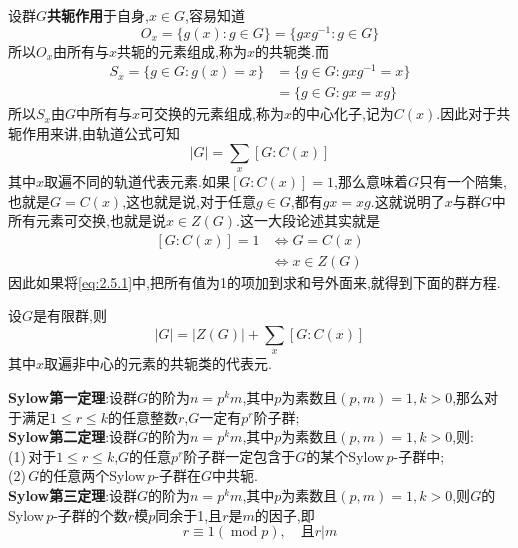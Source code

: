 设群$G$\textbf{共轭作用}于自身,$x\in G$,容易知道
$$
O_x=\{g(x):g\in G\}=\{gxg^{-1}:g\in G\}
$$
所以$O_x$由所有与$x$共轭的元素组成,称为$x$的共轭类.而
$$
\begin{aligned}
    S_x=\{g\in G:g(x)=x\} &= \{g\in G:gxg^{-1}=x\}\\
                          &= \{g\in G:gx=xg\}
\end{aligned}
$$
所以$S_x$由$G$中所有与$x$可交换的元素组成,称为$x$的中心化子,记为$C(x)$.因此对于共轭作用来讲,由轨道公式可知
\begin{equation}
    |G|=\sum_x[G:C(x)]
    \label{eq:2.5.1}
\end{equation}
其中$x$取遍不同的轨道代表元素.如果$[G:C(x)]=1$,那么意味着$G$只有一个陪集,也就是$G=C(x)$,这也就是说,对于任意$g\in G$,都有$gx=xg$.这就说明了$x$与群$G$中所有元素可交换,也就是说$x\in Z(G)$.这一大段论述其实就是
$$
\begin{aligned}
    [G:C(x)]=1 &\Longleftrightarrow G=C(x)\\
               &\Longleftrightarrow x\in Z(G)
\end{aligned}
$$
因此如果将\eqref{eq:2.5.1}中,把所有值为1的项加到求和号外面来,就得到下面的群方程.\
\begin{tcolorbox}[colback=KuangNei,colframe=BianKuang,title=\textbf{群方程},sharpish corners]
    设$G$是有限群,则
    $$
    |G|=|Z(G)|+\sum_{x}[G:C(x)]
    $$
    其中$x$取遍非中心的元素的共轭类的代表元.
\end{tcolorbox}

\begin{tcolorbox}[colback=KuangNei,colframe=BianKuang,title=\textbf{Sylow定理},sharpish corners]
    \textbf{Sylow第一定理}:设群$G$的阶为$n=p^km$,其中$p$为素数且$(p,m)=1,k>0$,那么对于满足$1\leqslant r\leqslant k$的任意整数$r$,$G$一定有$p^r$阶子群;\\
    \textbf{Sylow第二定理}:设群$G$的阶为$n=p^km$,其中$p$为素数且$(p,m)=1,k>0$,则:\\
    \qquad (1)\,对于$1\leqslant r\leqslant k$,$G$的任意$p^r$阶子群一定包含于$G$的某个Sylow\,$p$-子群中;\\
    \qquad (2)\,$G$的任意两个Sylow\,$p$-子群在$G$中共轭.\\
    \textbf{Sylow第三定理}:设群$G$的阶为$n=p^km$,其中$p$为素数且$(p,m)=1,k>0$,则$G$的Sylow\,$p$-子群的个数$r$模$p$同余于1,且$r$是$m$的因子,即
    $$
    r\equiv 1(\operatorname{mod} p),\quad \text{且}r|m
    $$
\end{tcolorbox}




























